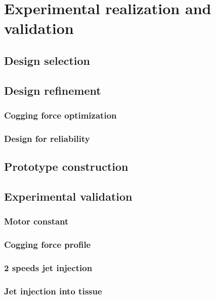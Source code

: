 \chapter{Experimental realization and validation}   \label{Chapter:experiment}

\section{Design selection}                          \label{Chapter:experiment/design selection}


\section{Design refinement}                         \label{Chapter:experiment/design refinement}
    \subsection{Cogging force optimization}         \label{Chapter:experiment/design refinement/cogging force optimization}
    \subsection{Design for reliability}             \label{Chapter:experiment/design refinement/design for reliability}


\section{Prototype construction}                    \label{Chapter:experiment/prototype construction}


\section{Experimental validation}                   \label{Chapter:experiment/experimental validation}
    \subsection{Motor constant}                     \label{Chapter:experiment/experimental validation/motor constant}
    \subsection{Cogging force profile}              \label{Chapter:experiment/experimental validation/cogging force}
    \subsection{2 speeds jet injection}             \label{Chapter:experiment/experimental validation/2 speed jet injection}
    \subsection{Jet injection into tissue}          \label{Chapter:experiment/experimental validation/jet injection into tissue}
    
